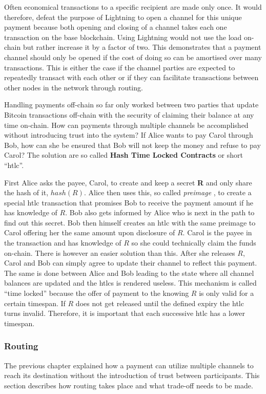 \documentclass[final]{fhnwreport}       %
\begin{document}
Often economical transactions to a specific recipient are made only once. It would therefore, defeat the purpose of Lightning to open a channel for this unique payment because both opening and closing of a channel takes each one transaction on the base \gls{blockchain}. Using Lightning would not use the load on-chain but rather increase it by a factor of two. This demonstrates that a payment channel should only be opened if the cost of doing so can be amortised over many transactions. This is either the case if the channel parties are expected to repeatedly transact with each other or if they can facilitate transactions between other nodes in the network through routing. 

Handling payments off-chain so far only worked between two parties that update Bitcoin transactions off-chain with the security of claiming their balance at any time on-chain. How can payments through multiple channels be accomplished without introducing trust into the system? If Alice wants to pay Carol through Bob, how can she be ensured that Bob will not keep the money and refuse to pay Carol? The solution are so called \textbf{Hash Time Locked Contracts} or short ``\gls{htlc}''. 

First Alice asks the payee, Carol, to create and keep a secret \textbf{R} and only share the hash of it, $hash(R)$. Alice then uses this, so called \textit{preimage} , to create a special \gls{htlc} transaction that promises Bob to receive the payment amount if he has knowledge of $R$. Bob also gets informed by Alice who is next in the path to find out this secret. Bob then himself creates an \gls{htlc} with the same preimage to Carol offering her the same amount upon disclosure of $R$. Carol is the payee in the transaction and has knowledge of $R$ so she could technically claim the funds on-chain. There is however an easier solution than this. After she releases $R$, Carol and Bob can simply agree to update their channel to reflect this payment. The same is done between Alice and Bob leading to the state where all channel balances are updated and the \gls{htlc}s is rendered useless. This mechanism is called ``time locked'' because the offer of payment to the knowing $R$ is only valid for a certain timespan. If $R$ does not get released until the defined expiry the \gls{htlc} turns invalid. Therefore, it is important that each successive \gls{htlc} has a lower timespan.

\subsubsection{Routing}\label{subsec:routing}
The previous chapter explained how a payment can utilize multiple channels to reach its destination without the introduction of trust between participants. This section describes how routing takes place and what trade-off needs to be made.
\end{document}
